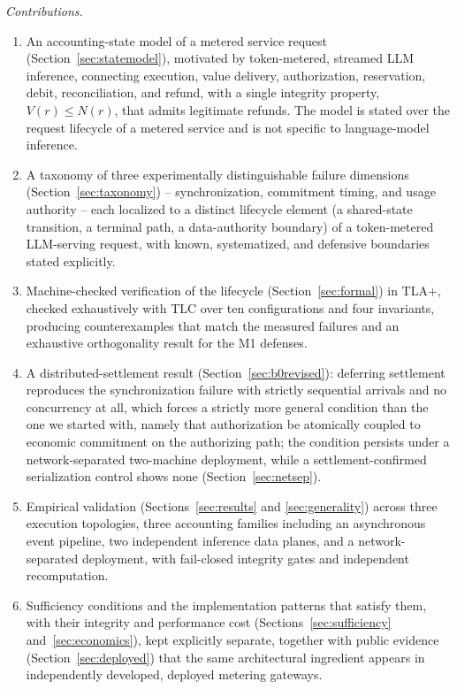 \documentclass[manuscript,review]{acmart}
\begin{document}
\textit{Contributions.}
\begin{enumerate}
\item An accounting-state model of a metered service request
(Section~\ref{sec:statemodel}), motivated by token-metered, streamed LLM inference,
connecting execution, value delivery, authorization,
reservation, debit, reconciliation, and refund, with a single integrity property,
$V(r) \le N(r)$, that admits legitimate refunds. The model is stated over the request
lifecycle of a metered service and is not specific to language-model inference.
\item A taxonomy of three experimentally distinguishable failure dimensions
(Section~\ref{sec:taxonomy}) -- synchronization, commitment timing, and usage authority --
each localized to a distinct lifecycle element (a shared-state transition, a terminal
path, a data-authority boundary) of a token-metered LLM-serving request, with known,
systematized, and defensive boundaries stated explicitly.
\item Machine-checked verification of the lifecycle (Section~\ref{sec:formal}) in TLA+,
checked exhaustively with TLC over ten configurations and four invariants, producing
counterexamples that match the measured failures and an exhaustive orthogonality result
for the M1 defenses.
\item A distributed-settlement result (Section~\ref{sec:b0revised}): deferring settlement
reproduces the synchronization failure with strictly sequential arrivals and no
concurrency at all, which forces a strictly more general condition than the one we
started with, namely that authorization be atomically coupled to economic commitment on
the authorizing path; the condition persists under a network-separated two-machine
deployment, while a settlement-confirmed serialization control shows none
(Section~\ref{sec:netsep}).
\item Empirical validation (Sections~\ref{sec:results} and \ref{sec:generality}) across
three execution topologies, three accounting families including an asynchronous event
pipeline, two independent inference data planes, and a network-separated deployment, with
fail-closed integrity gates and independent recomputation.
\item Sufficiency conditions and the implementation patterns that satisfy them, with
their integrity and performance cost (Sections~\ref{sec:sufficiency}
and~\ref{sec:economics}), kept explicitly separate, together with
public evidence (Section~\ref{sec:deployed}) that the same architectural ingredient
appears in independently developed, deployed metering gateways.
\end{enumerate}
\end{document}

